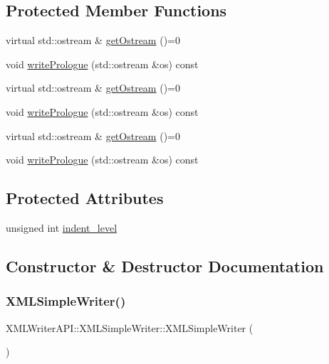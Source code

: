 \subsection*{Protected Member Functions}
\begin{DoxyCompactItemize}
\item 
virtual std\+::ostream \& \mbox{\hyperlink{classXMLWriterAPI_1_1XMLSimpleWriter_aaf70b3dcddd7880e838bbc266426dfd5}{get\+Ostream}} ()=0
\item 
void \mbox{\hyperlink{classXMLWriterAPI_1_1XMLSimpleWriter_a09f9ed556d1da6657529363bcee2c61c}{write\+Prologue}} (std\+::ostream \&os) const
\item 
virtual std\+::ostream \& \mbox{\hyperlink{classXMLWriterAPI_1_1XMLSimpleWriter_aaf70b3dcddd7880e838bbc266426dfd5}{get\+Ostream}} ()=0
\item 
void \mbox{\hyperlink{classXMLWriterAPI_1_1XMLSimpleWriter_a1f44b3dd9970ce14e8a4fcf026226028}{write\+Prologue}} (std\+::ostream \&os) const
\item 
virtual std\+::ostream \& \mbox{\hyperlink{classXMLWriterAPI_1_1XMLSimpleWriter_aaf70b3dcddd7880e838bbc266426dfd5}{get\+Ostream}} ()=0
\item 
void \mbox{\hyperlink{classXMLWriterAPI_1_1XMLSimpleWriter_a1f44b3dd9970ce14e8a4fcf026226028}{write\+Prologue}} (std\+::ostream \&os) const
\end{DoxyCompactItemize}
\subsection*{Protected Attributes}
\begin{DoxyCompactItemize}
\item 
unsigned int \mbox{\hyperlink{classXMLWriterAPI_1_1XMLSimpleWriter_a61ccdacc4406db6a4a78c77a16f150da}{indent\+\_\+level}}
\end{DoxyCompactItemize}


\subsection{Constructor \& Destructor Documentation}
\mbox{\label{classXMLWriterAPI_1_1XMLSimpleWriter_aa22ad5550ae58f1a9dc9056c4d342d8b}} 
\subsubsection{\texorpdfstring{XMLSimpleWriter()}{XMLSimpleWriter()}\hspace{0.1cm}{\footnotesize\ttfamily [1/3]}}
{\footnotesize\ttfamily X\+M\+L\+Writer\+A\+P\+I\+::\+X\+M\+L\+Simple\+Writer\+::\+X\+M\+L\+Simple\+Writer (\begin{DoxyParamCaption}{ }\end{DoxyParamCaption})\hspace{0.3cm}{\ttfamily [inline]}}


